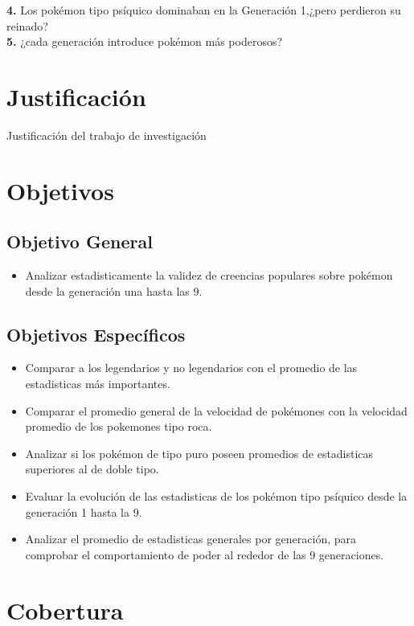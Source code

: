\documentclass[oneside,11pt]{Latex/Classes/PhDthesisPSnPDF}
\begin{document}
\textbf{4.} Los pokémon tipo psíquico dominaban en la Generación 1,¿pero
perdieron su reinado?\\

\textbf{5.} ¿cada generación introduce pokémon más poderosos?\\

\section{Justificación}

Justificación del trabajo de investigación\\

\section{Objetivos}

\subsection{Objetivo General}
\begin{itemize}
  \item{Analizar estadisticamente la validez de creencias populares sobre pokémon desde la generación una hasta las 9.}
\end{itemize}

\subsection{Objetivos Específicos}
\begin{itemize}
  \item{Comparar a los legendarios y no legendarios con el promedio de las estadisticas más importantes.}
  \item{Comparar el promedio general de la velocidad de pokémones con la velocidad promedio de los pokemones tipo roca.}
  \item{Analizar si los pokémon de tipo puro poseen promedios de estadisticas superiores al de doble tipo.}
  \item{Evaluar la evolución de las estadisticas de los pokémon tipo psíquico desde la generación 1 hasta la 9.}
  \item{Analizar el promedio de estadisticas generales por generación, para comprobar el comportamiento de poder al rededor de las 9 generaciones.}
\end{itemize}

\section{Cobertura}
\end{document}
